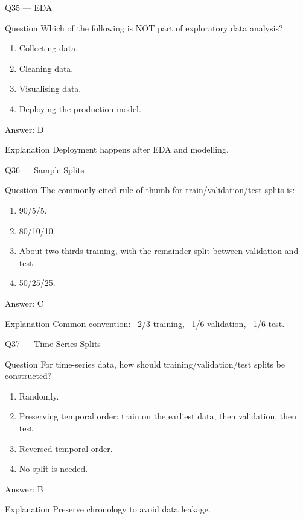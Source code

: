\documentclass[aspectratio=169,8pt]{beamer}
\begin{document}
	\begin{frame}{Q35 --- EDA}
		\begin{block}{Question}
			Which of the following is NOT part of exploratory data analysis?
		\end{block}
		\begin{enumerate}
			\item Collecting data.
			\item Cleaning data.
			\item Visualising data.
			\item Deploying the production model.
		\end{enumerate}
		\begin{exampleblock}{Answer: D}\end{exampleblock}
		\begin{block}{Explanation}
			Deployment happens after EDA and modelling.
		\end{block}
	\end{frame}
	
	\begin{frame}{Q36 --- Sample Splits}
		\begin{block}{Question}
			The commonly cited rule of thumb for train/validation/test splits is:
		\end{block}
		\begin{enumerate}
			\item 90/5/5.
			\item 80/10/10.
			\item About two-thirds training, with the remainder split between validation and test.
			\item 50/25/25.
		\end{enumerate}
		\begin{exampleblock}{Answer: C}\end{exampleblock}
		\begin{block}{Explanation}
			Common convention: ~2/3 training, ~1/6 validation, ~1/6 test.
		\end{block}
	\end{frame}
	
	\begin{frame}{Q37 --- Time-Series Splits}
		\begin{block}{Question}
			For time-series data, how should training/validation/test splits be constructed?
		\end{block}
		\begin{enumerate}
			\item Randomly.
			\item Preserving temporal order: train on the earliest data, then validation, then test.
			\item Reversed temporal order.
			\item No split is needed.
		\end{enumerate}
		\begin{exampleblock}{Answer: B}\end{exampleblock}
		\begin{block}{Explanation}
			Preserve chronology to avoid data leakage.
		\end{block}
	\end{frame}
	
\end{document}
